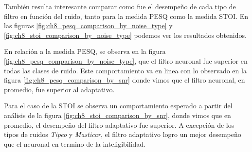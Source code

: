 También resulta interesante comparar como fue el desempeño de cada tipo de filtro en función del ruido, tanto para la medida PESQ como la medida STOI. En las figuras \ref{fig:ch8_pesq_comparison_by_noise_type} y \ref{fig:ch8_stoi_comparison_by_noise_type} podemos ver los resultados obtenidos.

En relación a la medida PESQ, se observa en la figura \ref{fig:ch8_pesq_comparison_by_noise_type}, que el filtro neuronal
fue superior en todas las clases de ruido. Este comportamiento va en linea con lo observado en la figura \ref{fig:ch8_pesq_comparison_by_snr} donde vimos que el filtro neuronal, en promedio, fue superior al adaptativo.


Para el caso de la STOI se observa un comportamiento esperado a partir del análisis de la figura \ref{fig:ch8_stoi_comparison_by_snr}, donde vimos que en promedio, el desempeño del filtro adaptativo fue superior. A excepción de los tipos de ruidos \emph{Tipeo} y \emph{Masticar}, el filtro adaptativo logro un mejor desempeño que el neuronal en termino de la inteligibilidad.